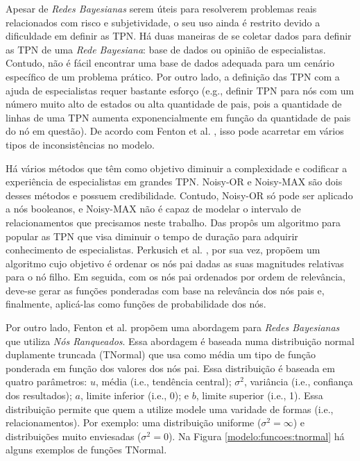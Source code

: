Apesar de \textit{Redes Bayesianas} serem úteis para resolverem problemas reais relacionados com risco e subjetividade, o seu uso ainda é restrito devido a dificuldade em definir as TPN. Há duas maneiras de se coletar dados para definir as TPN de uma \textit{Rede Bayesiana}: base de dados ou opinião de especialistas. Contudo, não é fácil encontrar uma base de dados adequada para um cenário específico de um problema prático. Por outro lado, a definição das TPN com a ajuda de especialistas requer bastante esforço (e.g., definir TPN para nós com um número muito alto de estados ou alta quantidade de pais, pois a quantidade de linhas de uma TPN aumenta exponencialmente em função da quantidade de pais do nó em questão). De acordo com Fenton et al. \cite{fenton}, isso pode acarretar em vários tipos de inconsistências no modelo.

Há vários métodos que têm como objetivo diminuir a complexidade e codificar a experiência de especialistas em grandes TPN. Noisy-OR \cite{huang} e Noisy-MAX \cite{diez} são dois desses métodos e possuem credibilidade. Contudo, Noisy-OR só pode ser aplicado a nós booleanos, e Noisy-MAX não é capaz de modelar o intervalo de relacionamentos que precisamos neste trabalho. Das \cite{das} propôs um algoritmo para popular as TPN que visa diminuir o tempo de duração para adquirir conhecimento de especialistas. Perkusich et al. \cite{perkusichNPT}, por sua vez, propõem um algoritmo cujo objetivo é ordenar os nós pai dadas as suas magnitudes relativas para o nó filho. Em seguida, com os nós pai ordenados por ordem de relevância, deve-se gerar as funções ponderadas com base na relevância dos nós pais e, finalmente, aplicá-las como funções de probabilidade dos nós.

Por outro lado, Fenton et al. \cite{fenton} propõem uma abordagem para \textit{Redes Bayesianas} que utiliza \textit{Nós Ranqueados}. Essa abordagem é baseada numa distribuição normal duplamente truncada (TNormal) que usa como média um tipo de função ponderada em função dos valores dos nós pai. Essa distribuição é baseada em quatro parâmetros: $u$, média (i.e., tendência central); $\sigma^{2}$, variância (i.e., confiança dos resultados); $a$, limite inferior (i.e., 0); e $b$, limite superior (i.e., 1). Essa distribuição permite que quem a utilize modele uma varidade de formas (i.e., relacionamentos). Por exemplo: uma distribuição uniforme ($\sigma^{2} = \infty$) e distribuições muito enviesadas ($\sigma^{2} = 0$). Na Figura \ref{modelo:funcoes:tnormal} há alguns exemplos de funções TNormal.


